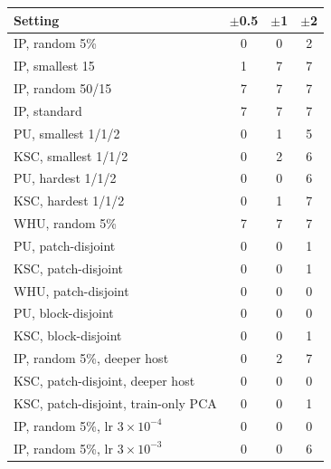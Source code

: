 \begin{tabular}{lccc}
\toprule
Setting & $\pm$0.5 & $\pm$1 & $\pm$2 \\
\midrule
IP, random 5\% & 0 & 0 & 2 \\
IP, smallest 15 & 1 & 7 & 7 \\
IP, random 50/15 & 7 & 7 & 7 \\
IP, standard & 7 & 7 & 7 \\
\midrule
PU, smallest 1/1/2 & 0 & 1 & 5 \\
KSC, smallest 1/1/2 & 0 & 2 & 6 \\
PU, hardest 1/1/2 & 0 & 0 & 6 \\
KSC, hardest 1/1/2 & 0 & 1 & 7 \\
\midrule
WHU, random 5\% & 7 & 7 & 7 \\
PU, patch-disjoint & 0 & 0 & 1 \\
KSC, patch-disjoint & 0 & 0 & 1 \\
WHU, patch-disjoint & 0 & 0 & 0 \\
PU, block-disjoint & 0 & 0 & 0 \\
KSC, block-disjoint & 0 & 0 & 1 \\
\midrule
IP, random 5\%, deeper host & 0 & 2 & 7 \\
KSC, patch-disjoint, deeper host & 0 & 0 & 0 \\
KSC, patch-disjoint, train-only PCA & 0 & 0 & 1 \\
IP, random 5\%, lr $3\times10^{-4}$ & 0 & 0 & 0 \\
IP, random 5\%, lr $3\times10^{-3}$ & 0 & 0 & 6 \\
\bottomrule
\end{tabular}
